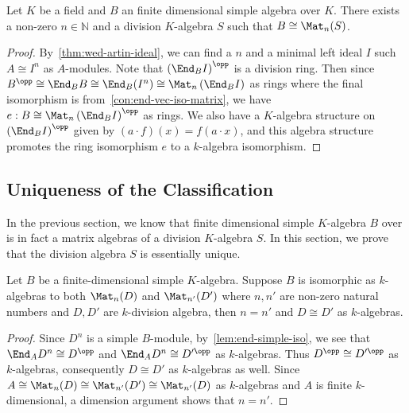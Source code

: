 \begin{theorem} \label{thm:wed-artin-algebra}
 Let $K$ be a field and $B$ an finite dimensional simple algebra over $K$.
  There exists a non-zero $n\in\mathbb{N}$ and a division $K$-algebra $S$ such
  that $B \cong \Mat_{n}(S)$.
  \leanok
\end{theorem}

\begin{proof}
  By~\cref{thm:wed-artin-ideal}, we can find a $n$ and a minimal left ideal $I$
  such $A \cong I^{n}$ as $A$-modules. Note that
  ${\left(\End_{B}I\right)}^{\opp}$ is a division ring. Then since
  $B^{\opp}\cong\End_{B}B\cong{\End_{B}(I^{n})}\cong\Mat_{n}\left(\End_{B}I\right)$
  as rings where the final isomorphism is from~\cref{con:end-vec-iso-matrix}, we
  have $e : B\cong \Mat_{n}\left(\End_{B}I\right)^{\opp}$ as rings. We also have
  a $K$-algebra structure on ${\left(\End_{B} I\right)}^{\opp}$ given by
  $(a \cdot f)(x)=f(a\cdot x)$, and this algebra structure promotes the ring
  isomorphism $e$ to a $k$-algebra isomorphism.
\end{proof}

\subsection{Uniqueness of the Classification}\label{sec:wed-artin-unique}
In the previous section, we know that finite dimensional simple $K$-algebra $B$
over is in fact a matrix algebras of a division $K$-algebra $S$. In this
section, we prove that the division algebra $S$ is essentially unique.

\begin{theorem}\label{thm:wed-artin-uniq}
  Let $B$ be a
  finite-dimensional simple $K$-algebra. Suppose $B$ is isomorphic as
  $k$-algebras to both $\Mat_{n}(D)$ and $\Mat_{n'}(D')$ where $n, n'$ are
  non-zero natural numbers and $D, D'$ are $k$-division algebra, then $n = n'$
  and $D \cong D'$ as $k$-algebras.\label{thm:wed-artin-unique} \leanok
\end{theorem}

\begin{proof}
  Since $D^{n}$ is a simple $B$-module, by~\cref{lem:end-simple-iso}, we see
  that $\End_{A}D^{n}\cong D^{\opp}$ and $\End_{A}D^{n}\cong D'^{\opp}$ as
  $k$-algebras. Thus $D^{\opp}\cong D'^{\opp}$ as $k$-algebras, consequently
  $D\cong D'$ as $k$-algebras as well. Since
  $A \cong \Mat_{n}(D)\cong \Mat_{n'}(D')\cong \Mat_{n'}(D)$ as $k$-algebras and
  $A$ is finite $k$-dimensional, a dimension argument shows that $n=n'$.
\end{proof}


